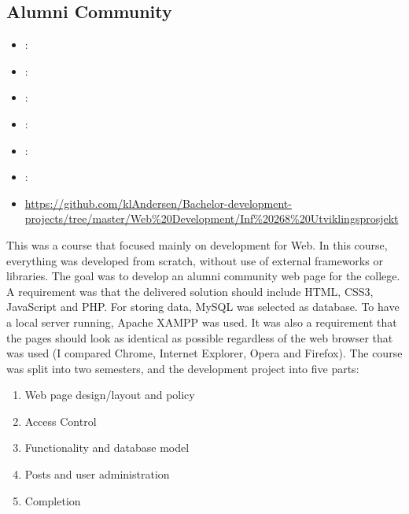 \label{sec:section6}

\subsection{Alumni Community}
\label{sec:alumni}
\begin{itemize} 
	\item {}: 
	\item {}: 
	\item {}: 
	\item {}: 
	\item {}: 
	\item {}: 
	\item {} \url{https://github.com/klAndersen/Bachelor-development-projects/tree/master/Web%20Development/Inf%20268%20Utviklingsprosjekt}
\end{itemize} 
This was a course that focused mainly on development for Web. 
In this course, everything was developed from scratch, without use of external frameworks or libraries. 
The goal was to develop an alumni community web page for the college. 
A requirement was that the delivered solution should include HTML, CSS3, JavaScript and PHP. 
For storing data, MySQL was selected as database. 
To have a local server running, Apache XAMPP was used. 
It was also a requirement that the pages should look as identical as possible regardless of the web browser that was used 
(I compared Chrome, Internet Explorer, Opera and Firefox).
\vspace{0.5em}\newline
The course was split into two semesters, and the development project into five parts:
\begin{enumerate}
	\item Web page design/layout and policy
	\item Access Control
	\item Functionality and database model
	\item Posts and user administration
	\item Completion
\end{enumerate}
